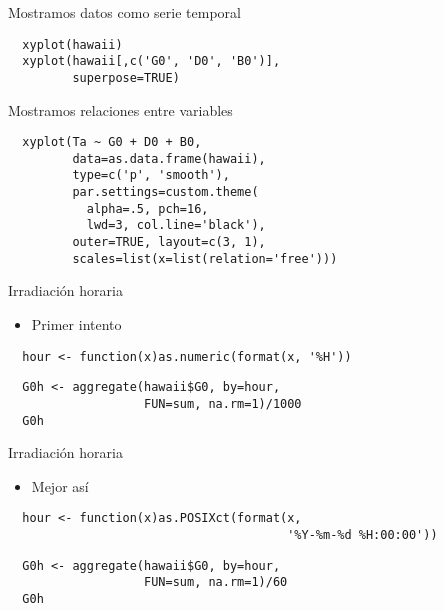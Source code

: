 \documentclass[xcolor={usenames,svgnames,dvipsnames}]{beamer}
\begin{document}
\begin{frame}[fragile,label=sec-4-3]{Mostramos datos como serie temporal}
 \lstset{language=R,label= ,caption= ,numbers=none}
\begin{lstlisting}
  xyplot(hawaii)
  xyplot(hawaii[,c('G0', 'D0', 'B0')],
         superpose=TRUE)
\end{lstlisting}
\end{frame}

\begin{frame}[fragile,label=sec-4-4]{Mostramos relaciones entre variables}
 \lstset{language=R,label= ,caption= ,numbers=none}
\begin{lstlisting}
  xyplot(Ta ~ G0 + D0 + B0,
         data=as.data.frame(hawaii),
         type=c('p', 'smooth'),
         par.settings=custom.theme(
           alpha=.5, pch=16,
           lwd=3, col.line='black'),
         outer=TRUE, layout=c(3, 1),
         scales=list(x=list(relation='free')))
\end{lstlisting}
\end{frame}

\begin{frame}[fragile,label=sec-4-5]{Irradiación horaria}
 \begin{itemize}
\item Primer intento
\end{itemize}
\lstset{language=R,label= ,caption= ,numbers=none}
\begin{lstlisting}
  hour <- function(x)as.numeric(format(x, '%H'))
\end{lstlisting}

\lstset{language=R,label= ,caption= ,numbers=none}
\begin{lstlisting}
  G0h <- aggregate(hawaii$G0, by=hour,
                   FUN=sum, na.rm=1)/1000
  G0h
\end{lstlisting}
\end{frame}

\begin{frame}[fragile,label=sec-4-6]{Irradiación horaria}
 \begin{itemize}
\item Mejor así
\end{itemize}
\lstset{language=R,label= ,caption= ,numbers=none}
\begin{lstlisting}
  hour <- function(x)as.POSIXct(format(x,
                                       '%Y-%m-%d %H:00:00'))
\end{lstlisting}

\lstset{language=R,label= ,caption= ,numbers=none}
\begin{lstlisting}
  G0h <- aggregate(hawaii$G0, by=hour,
                   FUN=sum, na.rm=1)/60
  G0h
\end{lstlisting}
\end{frame}
\end{document}
